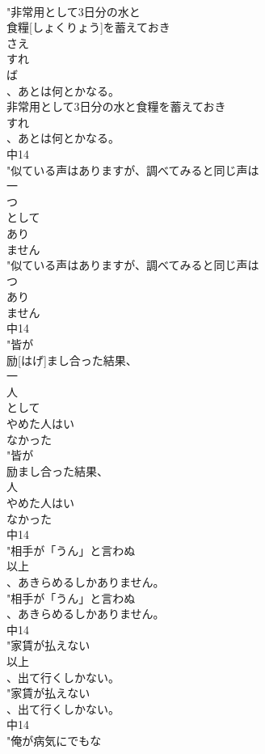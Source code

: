\documentclass[8pt]{extreport}
\begin{document}
\begin{CJK}{UTF8}{min}
\\	"非常用として3日分の水と
\\	食糧[しょくりょう]を蓄えておき
\\	さえ
\\	すれ
\\	ば
\\	、あとは何とかなる。
\\	非常用として3日分の水と食糧を蓄えておき
\\	すれ
\\	、あとは何とかなる。
\\	中14
\\	"似ている声はありますが、調べてみると同じ声は
\\	一
\\	つ
\\	として
\\	あり
\\	ません
\\	"似ている声はありますが、調べてみると同じ声は
\\	つ
\\	あり
\\	ません
\\	中14
\\	"皆が
\\	励[はげ]まし合った結果、
\\	一
\\	人
\\	として
\\	やめた人はい
\\	なかった
\\	"皆が
\\	励まし合った結果、
\\	人
\\	やめた人はい
\\	なかった
\\	中14
\\	"相手が「うん」と言わぬ
\\	以上
\\	、あきらめるしかありません。
\\	"相手が「うん」と言わぬ
\\	、あきらめるしかありません。
\\	中14
\\	"家賃が払えない
\\	以上
\\	、出て行くしかない。
\\	"家賃が払えない
\\	、出て行くしかない。
\\	中14
\\	"俺が病気にでもな

\end{CJK}
\end{document}
